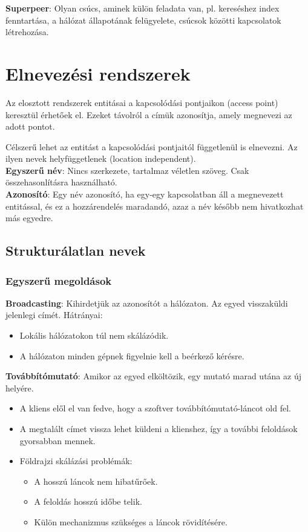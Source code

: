 \documentclass[margin=0px]{article}
\begin{document}
\noindent \textbf{Superpeer}: Olyan csúcs, aminek külön feladata van, pl. kereséshez index fenntartása, a hálózat
állapotának felügyelete, csúcsok közötti kapcsolatok létrehozása.

\section{Elnevezési rendszerek}

Az elosztott rendszerek entitásai a kapcsolódási pontjaikon (access point) keresztül érhetőek el. Ezeket távolról
a címük azonosítja, amely megnevezi az adott pontot.

Célszerű lehet az entitást a kapcsolódási pontjaitól függetlenül is elnevezni. Az ilyen nevek helyfüggetlenek (location
independent).\\

\noindent \textbf{Egyszerű név}: Nincs szerkezete, tartalmaz véletlen szöveg. Csak összehasonlításra használható.\\

\noindent \textbf{Azonosító}: Egy név azonosító, ha egy-egy kapcsolatban áll a megnevezett entitással, és ez
a hozzárendelés maradandó, azaz a név később nem hivatkozhat más egyedre.

\subsection{Strukturálatlan nevek}

\subsubsection{Egyszerű megoldások}

\noindent \textbf{Broadcasting}: Kihirdetjük az azonosítót a hálózaton. Az egyed visszaküldi jelenlegi címét.
Hátrányai:
\begin{itemize}
    \item	Lokális hálózatokon túl nem skálázódik.

    \item	A hálózaton minden gépnek figyelnie kell a beérkező kérésre.
\end{itemize}

\noindent \textbf{Továbbítómutató}: Amikor az egyed elköltözik, egy mutató marad utána az új helyére.
\begin{itemize}
    \item	A kliens elől el van fedve, hogy a szoftver továbbítómutató-láncot old fel.
    \item	A megtalált címet vissza lehet küldeni a klienshez, így a további feloldások gyorsabban mennek.
    \item	Földrajzi skálázási problémák:
          \begin{itemize}
              \item	A hosszú láncok nem hibatűrőek.
              \item	A feloldás hosszú időbe telik.
              \item	Külön mechanizmus szükséges a láncok rövidítésére.
          \end{itemize}
\end{itemize}
\end{document}
